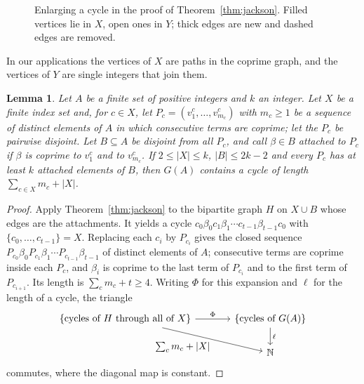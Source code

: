 \documentclass[11pt,a4paper]{article}
\newtheorem{lemma}[theorem]{Lemma}
\theoremstyle{definition}
\theoremstyle{remark}
\begin{document}
\begin{figure}[t]
\centering

\caption{Enlarging a cycle in the proof of Theorem~\ref{thm:jackson}. Filled vertices lie in $X$,
open ones in $Y$; thick edges are new and dashed edges are removed.}
\label{fig:jackson}
\end{figure}

In our applications the vertices of $X$ are paths in the coprime graph, and the vertices of $Y$ are
single integers that join them.

\begin{lemma}\label{lem:assembly}
Let $A$ be a finite set of positive integers and $k$ an integer. Let $X$ be a finite index set and,
for $c\in X$, let $P_c=(v^c_1,\dots,v^c_{m_c})$ with $m_c\ge1$ be a sequence of distinct elements of
$A$ in which consecutive terms are coprime; let the $P_c$ be pairwise disjoint. Let $B\subseteq A$ be
disjoint from all $P_c$, and call $\beta\in B$ \emph{attached} to $P_c$ if $\beta$ is coprime to
$v^c_1$ and to $v^c_{m_c}$. If $2\le|X|\le k$, $|B|\le2k-2$ and every $P_c$ has at least $k$ attached
elements of $B$, then $G(A)$ contains a cycle of length $\sum_{c\in X}m_c+|X|$.
\end{lemma}

\begin{proof}
Apply Theorem~\ref{thm:jackson} to the bipartite graph $H$ on $X\cup B$ whose edges are the
attachments. It yields a cycle $c_0\beta_0c_1\beta_1\cdots c_{t-1}\beta_{t-1}c_0$ with
$\{c_0,\dots,c_{t-1}\}=X$. Replacing each $c_i$ by $P_{c_i}$ gives the closed sequence
$P_{c_0}\beta_0P_{c_1}\beta_1\cdots P_{c_{t-1}}\beta_{t-1}$ of distinct elements of $A$; consecutive
terms are coprime inside each $P_c$, and $\beta_i$ is coprime to the last term of $P_{c_i}$ and to
the first term of $P_{c_{i+1}}$. Its length is $\sum_c m_c+t\ge4$. Writing $\Phi$ for this expansion
and $\ell$ for the length of a cycle, the triangle
\begin{equation}\label{cd:assembly}
\begin{tikzcd}[column sep=large]
  \{\text{cycles of }H\text{ through all of }X\} \arrow[r, "\Phi"] \arrow[dr, "\textstyle\sum_c m_c+|X|"']
  & \{\text{cycles of }G(A)\} \arrow[d, "\ell"] \\
  & \mathbb{N}
\end{tikzcd}
\end{equation}
commutes, where the diagonal map is constant.
\end{proof}

\end{document}
